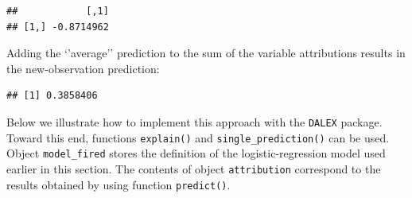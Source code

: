 \documentclass[12pt,]{krantz}
\newenvironment{Shaded}{\begin{snugshade}}{\end{snugshade}}
\newcommand{\DataTypeTok}[1]{\textcolor[rgb]{0.13,0.29,0.53}{#1}}
\newcommand{\DecValTok}[1]{\textcolor[rgb]{0.00,0.00,0.81}{#1}}
\newcommand{\KeywordTok}[1]{\textcolor[rgb]{0.13,0.29,0.53}{\textbf{#1}}}
\newcommand{\NormalTok}[1]{#1}
\newcommand{\OperatorTok}[1]{\textcolor[rgb]{0.81,0.36,0.00}{\textbf{#1}}}
\newcommand{\StringTok}[1]{\textcolor[rgb]{0.31,0.60,0.02}{#1}}
\theoremstyle{definition}
\theoremstyle{definition}
\theoremstyle{definition}
\theoremstyle{remark}
\begin{document}
\begin{Shaded}
\end{Shaded}

\begin{verbatim}
##            [,1]
## [1,] -0.8714962
\end{verbatim}

Adding the `'average'' prediction to the sum of the variable
attributions results in the new-observation prediction:

\begin{Shaded}
\end{Shaded}

\begin{verbatim}
## [1] 0.3858406
\end{verbatim}

Below we illustrate how to implement this approach with the
\texttt{DALEX} package. Toward this end, functions \texttt{explain()}
and \texttt{single\_prediction()} can be used. Object
\texttt{model\_fired} stores the definition of the logistic-regression
model used earlier in this section. The contents of object
\texttt{attribution} correspond to the results obtained by using
function \texttt{predict()}.

\begin{Shaded}
\end{Shaded}
\end{document}

